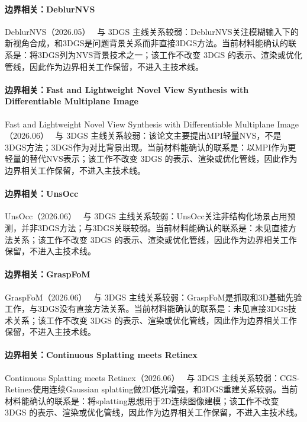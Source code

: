 \paragraph{边界相关：DeblurNVS}
DeblurNVS（2026.05）~\cite{2606_01315} 与 3DGS 主线关系较弱：DeblurNVS关注模糊输入下的新视角合成，和3DGS是问题背景关系而非直接3DGS方法。当前材料能确认的联系是：将3DGS列为NVS背景技术之一；该工作不改变 3DGS 的表示、渲染或优化管线，因此作为边界相关工作保留，不进入主技术线。

\paragraph{边界相关：Fast and Lightweight Novel View Synthesis with Differentiable Multiplane Image}
Fast and Lightweight Novel View Synthesis with Differentiable Multiplane Image（2026.06）~\cite{2606_02068} 与 3DGS 主线关系较弱：该论文主要提出MPI轻量NVS，不是3DGS方法；3DGS作为对比背景出现。当前材料能确认的联系是：以MPI作为更轻量的替代NVS表示；该工作不改变 3DGS 的表示、渲染或优化管线，因此作为边界相关工作保留，不进入主技术线。

\paragraph{边界相关：UnsOcc}
UnsOcc（2026.06）~\cite{2606_03581} 与 3DGS 主线关系较弱：UnsOcc关注非结构化场景占用预测，并非3DGS方法；与3DGS关联较弱。当前材料能确认的联系是：未见直接方法关系；该工作不改变 3DGS 的表示、渲染或优化管线，因此作为边界相关工作保留，不进入主技术线。

\paragraph{边界相关：GraspFoM}
GraspFoM（2026.06）~\cite{2606_08440} 与 3DGS 主线关系较弱：GraspFoM是抓取和3D基础先验工作，与3DGS没有直接方法关系。当前材料能确认的联系是：未见直接3DGS技术关系；该工作不改变 3DGS 的表示、渲染或优化管线，因此作为边界相关工作保留，不进入主技术线。

\paragraph{边界相关：Continuous Splatting meets Retinex}
Continuous Splatting meets Retinex（2026.06）~\cite{2606_16159} 与 3DGS 主线关系较弱：CGS-Retinex使用连续Gaussian splatting做2D低光增强，和3DGS重建关系较弱。当前材料能确认的联系是：将splatting思想用于2D连续图像建模；该工作不改变 3DGS 的表示、渲染或优化管线，因此作为边界相关工作保留，不进入主技术线。

